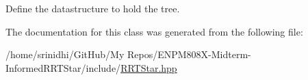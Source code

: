 Define the datastructure to hold the tree. 



The documentation for this class was generated from the following file\+:\begin{DoxyCompactItemize}
\item 
/home/srinidhi/\+Git\+Hub/\+My Repos/\+E\+N\+P\+M808\+X-\/\+Midterm-\/\+Informed\+R\+R\+T\+Star/include/\hyperlink{RRTStar_8hpp}{R\+R\+T\+Star.\+hpp}\end{DoxyCompactItemize}
